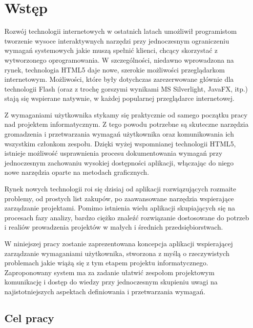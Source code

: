 \chapter{Wstęp}

    Rozwój technologii internetowych w ostatnich latach umożliwił programistom tworzenie wysoce interaktywnych narzędzi przy jednoczesnym ograniczeniu wymagań systemowych jakie muszą spełnić klienci, chcący skorzystać z wytworzonego oprogramowania. W szczególności, niedawno wprowadzona na rynek, technologia HTML5 daje nowe, szerokie możliwości przeglądarkom internetowym. Możliwości, które były dotychczas zarezerwowane głównie dla technologii Flash (oraz z trochę gorszymi wynikami MS Silverlight, JavaFX, itp.) stają się wspierane natywnie, w każdej popularnej przeglądarce internetowej. 

    Z wymaganiami użytkownika stykamy się praktycznie od samego początku pracy nad projektem informatycznym. Z tego powodu potrzebne są skuteczne narzędzia gromadzenia i przetwarzania wymagań użytkownika oraz komunikowania ich wszystkim członkom zespołu. Dzięki wyżej wspomnianej technologii HTML5, istnieje możliwość usprawnienia procesu dokumentowania wymagań przy jednoczesnym zachowaniu wysokiej dostępności aplikacji, włączając do niego nowe narzędzia oparte na metodach graficznych. 

    Rynek nowych technologii roi się dzisiaj od aplikacji rozwiązujących rozmaite problemy, od prostych list zakupów, po zaawansowane narzędzia wspierające zarządzanie projektami. Pomimo istnienia wielu aplikacji skupiających się na procesach fazy analizy, bardzo ciężko znaleźć rozwiązanie dostosowane do potrzeb i realiów prowadzenia projektów w małych i średnich przedsiębiorstwach. 
          
    W niniejszej pracy zostanie zaprezentowana koncepcja aplikacji wspierającej zarządzanie wymaganiami użytkownika, stworzona z myślą o rzeczywistych problemach jakie wiążą się z tym etapem projektu informatycznego. Zaproponowany system ma za zadanie ułatwić zespołom projektowym komunikację i dostęp do wiedzy przy jednoczesnym skupieniu uwagi na najistotniejszych aspektach definiowania i przetwarzania wymagań.


    \section{Cel pracy}

